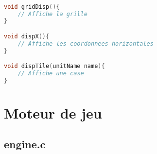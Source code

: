 \documentclass[a4paper,10pt]{extreport}
\begin{document}
\begin{lstlisting}[language=c]

void gridDisp(){
	// Affiche la grille
}

void dispX(){
	// Affiche les coordonnees horizontales
}

void dispTile(unitName name){
	// Affiche une case
}

\end{lstlisting}

\part{Moteur de jeu}

\chapter{engine.c}

\vspace{-1cm}
\end{document}
